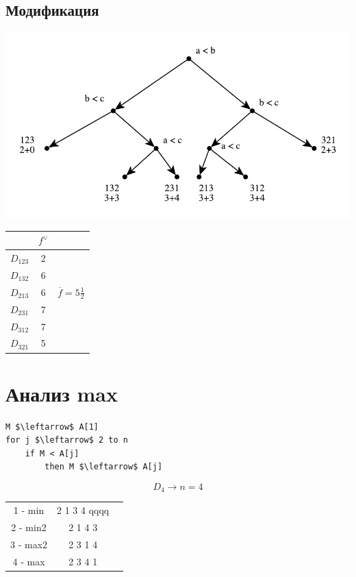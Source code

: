 \documentclass[a4paper, 14pt]{report}
\begin{document}
\subsection{Модификация}

\includegraphics{anal4}

\begin{tabular}{ccc}
              & $f^\vee$ & \\
    \hline
    $D_{123}$ & 2        & \\
    $D_{132}$ & 6        & \\
    $D_{213}$ & 6        & $\overline{f} = 5 \frac{1}{2}$\\
    $D_{231}$ & 7        & \\
    $D_{312}$ & 7        & \\
    $D_{321}$ & 5        & \\
\end{tabular}

\section{Анализ max}

\begin{lstlisting}
M $\leftarrow$ A[1]
for j $\leftarrow$ 2 to n
    if M < A[j]
        then M $\leftarrow$ A[j]
\end{lstlisting}

$$
D_4 \to n = 4
$$

\begin{tabular}{ccc}
    1 - min  & 2 1 3 4 qqqq\\
    2 - min2 & 2 1 4 3 \\
    3 - max2 & 2 3 1 4 \\
    4 - max  & 2 3 4 1 \\
\end{tabular}
\end{document}

